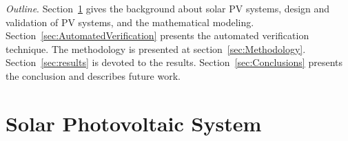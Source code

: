 \documentclass[journal]{IEEEtran}
\begin{document}
\textit{Outline}. Section~\ref{sec:SolarPhotovoltaicSystem} gives the background about solar PV systems, design and validation of PV systems, and the mathematical modeling. Section~\ref{sec:AutomatedVerification} presents the automated verification technique. The methodology is presented at section~\ref{sec:Methodology}. Section~\ref{sec:results} is devoted to the results. Section~\ref{sec:Conclusions} presents the conclusion and describes future work.

\section{Solar Photovoltaic System }
\label{sec:SolarPhotovoltaicSystem}

\end{document}
